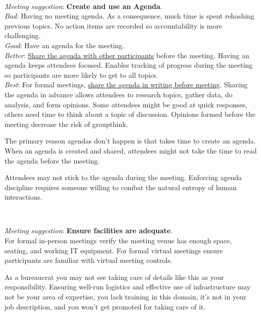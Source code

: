 \ \\
\begin{samepage}
\textit{Meeting suggestion}: \textbf{Create and use an Agenda}.\\
\textit{Bad}: Having no meeting agenda. As a consequence, much time is spent rehashing previous topics. No action items are recorded so accountability is more challenging. \\
\textit{Good}: Have an agenda for the meeting. \\
\textit{Better}: \underline{Share the agenda with other participants} before the meeting. Having an agenda keeps attendees focused.  Enables tracking of progress during the meeting so participants are more likely to get to all topics.\\
\textit{Best}: For formal meetings, \underline{share the agenda in writing before meeting}. Sharing the agenda in advance allows attendees to research topics, gather data, do analysis, and form opinions. Some attendees might be good at quick responses, others need time to think about a topic of discussion. Opinions formed before the meeting decrease the risk of groupthink. 
\end{samepage}

The primary reason agendas don't happen is that takes time to create an agenda. When an agenda is created and shared, attendees might not take the time to read the agenda before the meeting. 

Attendees may not stick to the agenda during the meeting. Enforcing agenda discipline requires someone willing to combat the natural entropy of human interactions. 



\ \\
\begin{samepage}
\textit{Meeting suggestion}: \textbf{Ensure facilities are adequate}.\\
For formal in-person meetings verify the meeting venue has enough space, seating, and working IT equipment. For formal virtual meetings ensure participants are familiar with virtual meeting controls. 
\end{samepage}

As a bureaucrat you may not see taking care of details like this as your responsibility. Ensuring well-run logistics and effective use of infrastructure may not be your area of expertise, you lack training in this domain, it's not in your job description, and you won't get promoted for taking care of it. 


